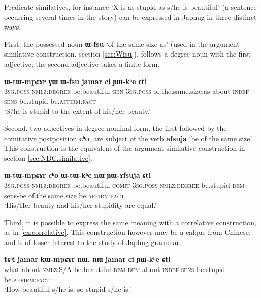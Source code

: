 \documentclass[oneside,a4paper,11pt]{article}
\newcommand{\ipa}[1]{{\phon\textbf{#1}}} %
\newcommand{\forme}[2]{\ipa{#1} `#2'}
\begin{document}
Predicate similatives, for instance `X is as stupid as s/he is beautiful' (a sentence occurring several times in the story) can be expressed in Japhug in three distinct ways.

First, the possessed noun \forme{ɯ-fsu}{of the same size as} (used in the argument similative construction, section \ref{sec:Wfsu}), follows a degree noun with the first adjective; the second adjective takes a finite form.

\begin{exe}
\ex 
\gll 
\ipa{ɯ-tɯ-mpɕɤr} \ipa{ɣɯ} 	\ipa{ɯ-fsu} 	\ipa{jamar} 	\ipa{ci} 	\ipa{ɲɯ-kʰe} 	\ipa{ɕti} \\
\textsc{3sg.poss-nmlz:degree}-be.beautiful \textsc{gen} \textsc{3sg.poss}-of.the.same.size.as about \textsc{indef} \textsc{sens}-be.stupid be.\textsc{affirm:fact} \\
\glt `S/he is stupid to the extent of his/her beauty.'
\end{exe}

Second, two adjectives in degree nominal form, the first followed by the comitative postposition \ipa{cʰo}, are subject of the verb \forme{afsuja}{be of the same size}. This construction is the equivalent of the argument similative construction in section \ref{sec:NDC.similative}.

\begin{exe}
\ex \label{ex:YAfsuja}
\gll 
\ipa{ɯ-tɯ-mpɕɤr} 	\ipa{cʰo} 	\ipa{ɯ-tɯ-kʰe} 	\ipa{nɯ} 	\ipa{ɲɯ-ɤfsuja} 	\ipa{ɕti} \\
\textsc{3sg.poss-nmlz:degree}-be.beautiful \textsc{comit} \textsc{3sg.poss-nmlz:degree}-be.stupid \textsc{dem} sens-be.of.the.same.size be.\textsc{affirm:fact} \\
\glt `His/Her beauty and his/her stupidity are equal.'
\end{exe}

Third, it is possible to express the same meaning with a correlative construction, as in \ref{ex:correlative}. This construction however may be a calque from Chinese, and is of lesser interest to the study of Japhug grammar.

\begin{exe}
\ex \label{ex:correlative}
\gll 
\ipa{tɕʰi} 	\ipa{jamar} 	\ipa{kɯ-mpɕɤr} 	\ipa{nɯ,} 	\ipa{nɯ} 	\ipa{jamar} 	\ipa{ci} 	\ipa{ɲɯ-kʰe} 	\ipa{ɕti} \\
what about \textsc{nmlz}:S/A-be.beautiful \textsc{dem} \textsc{dem} about \textsc{indef} \textsc{sens}-be.stupid be.\textsc{affirm:fact} \\
\glt `How beautiful s/he is, so stupid s/he is.'
\end{exe}
\end{document}
